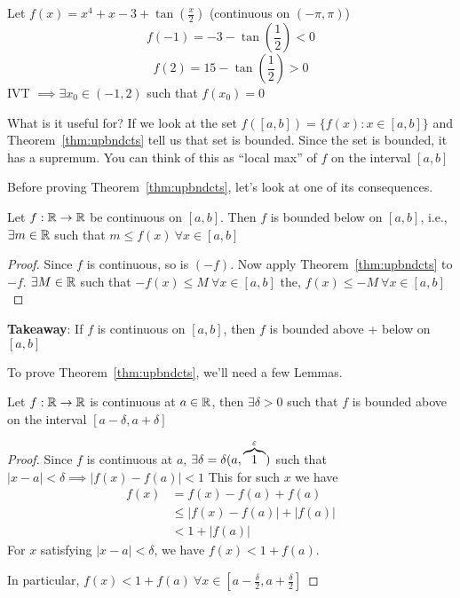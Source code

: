 \begin{example}
    Let $f(x) = x^4 + x - 3 + \tan\left(\frac{x}{2}\right)$ (continuous on $(-\pi, \pi)$)
    $$f(-1) = -3 - \tan\left(\frac{1}{2}\right) < 0$$
    $$f(2) = 15 - \tan\left(\frac{1}{2}\right) > 0$$
    IVT $\implies \exists x_0 \in (-1, 2)$ such that $f(x_0) = 0$
\end{example}


What is it useful for?
If we look at the set $f(\left[a, b\right]) = \{f(x) : x \in \left[a, b\right]\}$
and Theorem~\ref{thm:upbndcts} tell us that set is bounded.
Since the set is bounded, it has a supremum.
You can think of this as ``local max'' of $f$ on the interval $\left[a, b\right]$

Before proving Theorem~\ref{thm:upbndcts}, let's look at one of its consequences.

\begin{corollary}
    Let $f: \mathbb R \to \mathbb R$ be continuous on $\left[a, b\right]$.
    Then $f$ is bounded below on $\left[a, b\right]$, i.e.,
    $\exists m \in \mathbb R$ such that $m \leq f(x)\ \forall x \in \left[a, b\right]$
\end{corollary}
\begin{proof}
    Since $f$ is continuous, so is $(-f)$. Now apply Theorem~\ref{thm:upbndcts} to $-f$.
    $\exists M \in \mathbb R$ such that $-f(x) \leq M\ \forall x \in \left[a, b\right]$
    the, $f(x) \leq -M\ \forall x \in \left[a, b\right]$
\end{proof}

\textbf{Takeaway}: If $f$ is continuous on $\left[a, b\right]$, then $f$ is bounded above + below on $\left[a, b\right]$

To prove Theorem~\ref{thm:upbndcts}, we'll need a few Lemmas.
\begin{lemma}
    Let $f: \mathbb R \to \mathbb R$ is continuous at $a \in \mathbb R$, then $\exists \delta > 0$ such that
    $f$ is bounded above on the interval $\left[a-\delta, a + \delta\right]$
\end{lemma}
\begin{proof}
    Since $f$ is continuous at $a$, $\exists \delta = \delta(a, \overbrace{1}^\varepsilon)$ such that 
    $|x-a| < \delta \implies |f(x) - f(a)| < 1$
    This for such $x$ we have 
    \begin{align*}
        f(x) &= f(x) - f(a) + f(a) \\
        &\leq |f(x) - f(a)| + |f(a)| \\
        &< 1 + |f(a)|
    \end{align*}
    For $x$ satisfying $|x-a| < \delta$, we have $f(x) < 1 + f(a)$.

    In particular, $f(x) < 1 + f(a)\ \forall x \in \left[a-\frac{\delta}{2}, a + \frac{\delta}{2}\right]$ 
\end{proof}

